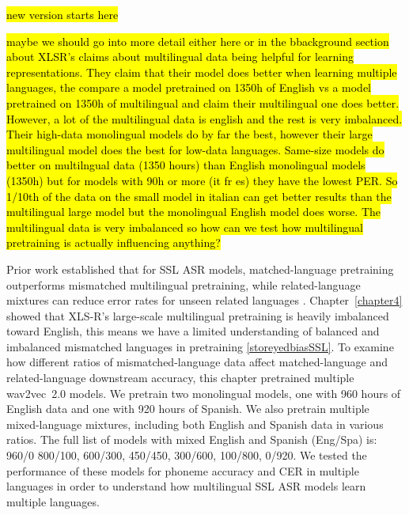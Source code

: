 \iffalse
\hl{new version starts here}

\hl{maybe we should go into more detail either here or in the bbackground section about XLSR's claims about multilingual data being helpful for learning representations. They claim that their model does better when learning multiple languages, the compare a model pretrained on 1350h of English vs a model pretrained on 1350h of multilingual and claim their multilingual one does better. However, a lot of the multilingual data is english and the rest is very imbalanced. Their high-data monolingual models do by far the best, however their large multilingual model does the best for low-data languages. Same-size models do better on multilngual data (1350 hours) than English monolingual models (1350h) but for models with 90h or more (it fr es) they have the lowest PER. So 1/10th of the data on the small model in italian can get better results than the multilingual large model but the monolingual English model does worse. The multilingual data is very imbalanced so how can we test how multilingual pretraining is actually influencing anything?}

Prior work established that for SSL ASR models, matched-language pretraining outperforms mismatched multilingual pretraining, while related-language mixtures can reduce error rates for unseen related languages \cite{wav2vec, ashihara2023exploration, gupta2021clsril}. Chapter~\ref{chapter4} showed that XLS-R's large-scale multilingual pretraining is heavily imbalanced toward English, this means we have a limited understanding of balanced and imbalanced mismatched languages in pretraining \ref{storeyedbiasSSL}. To examine how different ratios of mismatched-language data affect matched-language and related-language downstream accuracy, this chapter pretrained multiple wav2vec~2.0 models. We pretrain two monolingual models, one with 960 hours of English data and one with 920 hours of Spanish. We also pretrain multiple mixed-language mixtures, including both English and Spanish data in various ratios. The full list of models with mixed English and Spanish (Eng/Spa) is: 960/0 800/100, 600/300, 450/450, 300/600, 100/800, 0/920. We tested the performance of these models for phoneme accuracy and CER in multiple languages in order to understand how multilingual SSL ASR models learn multiple languages.

